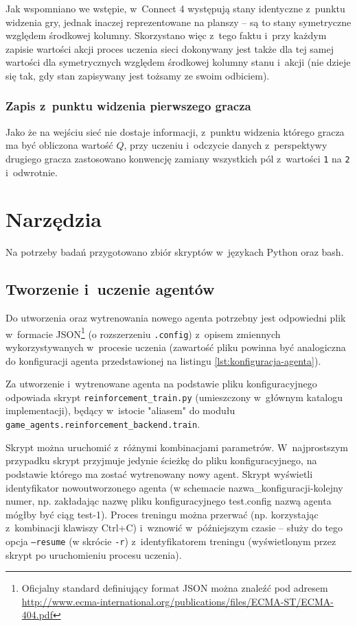 \documentclass[a4paper, 12pt, oneside]{report}
\begin{document}
Jak wspomniano we wstępie, w~Connect 4 występują stany identyczne z~punktu widzenia gry, jednak inaczej reprezentowane na planszy -- są to stany symetryczne względem środkowej kolumny. Skorzystano więc z~tego faktu i~przy każdym zapisie wartości akcji proces uczenia sieci dokonywany jest także dla tej samej wartości dla symetrycznych względem środkowej kolumny stanu i~akcji (nie dzieje się tak, gdy stan zapisywany jest tożsamy ze swoim odbiciem).

\subsubsection{Zapis z~punktu widzenia pierwszego gracza}

Jako że na wejściu sieć nie dostaje informacji, z~punktu widzenia którego gracza ma być obliczona wartość $Q$, przy uczeniu i~odczycie danych z~perspektywy drugiego gracza zastosowano konwencję zamiany wszystkich pól z~wartości \texttt{1} na \texttt{2} i~odwrotnie.

\section{Narzędzia}

Na potrzeby badań przygotowano zbiór skryptów w~językach Python oraz bash.

\subsection{Tworzenie i~uczenie agentów}

Do utworzenia oraz wytrenowania nowego agenta potrzebny jest odpowiedni plik w~formacie JSON\footnote{Oficjalny standard definiujący format JSON można znaleźć pod adresem \url{http://www.ecma-international.org/publications/files/ECMA-ST/ECMA-404.pdf}} (o rozszerzeniu \texttt{.config}) z~opisem zmiennych wykorzystywanych w~procesie uczenia (zawartość pliku powinna być analogiczna do konfiguracji agenta przedstawionej na listingu \ref{lst:konfiguracja-agenta}).

\begin{sloppypar}
Za utworzenie i~wytrenowane agenta na podstawie pliku konfiguracyjnego odpowiada skrypt \texttt{reinforcement\_train.py} (umieszczony w~głównym katalogu implementacji), będący w~istocie "aliasem" do modułu \texttt{game\_agents.reinforcement\_backend.train}.
\end{sloppypar}

Skrypt można uruchomić z~różnymi kombinacjami parametrów. W~najprostszym przypadku skrypt przyjmuje jedynie ścieżkę do pliku konfiguracyjnego, na podstawie którego ma zostać wytrenowany nowy agent. Skrypt wyświetli identyfikator nowoutworzonego agenta (w schemacie nazwa\_konfiguracji-kolejny numer, np. zakładając nazwę pliku konfiguracyjnego test.config nazwą agenta mógłby być ciąg test-1). Proces treningu można przerwać (np. korzystając z~kombinacji klawiszy Ctrl+C) i~wznowić w~późniejszym czasie -- służy do tego opcja \texttt{--resume} (w skrócie \texttt{-r}) z~identyfikatorem treningu (wyświetlonym przez skrypt po uruchomieniu procesu uczenia).
\end{document}

